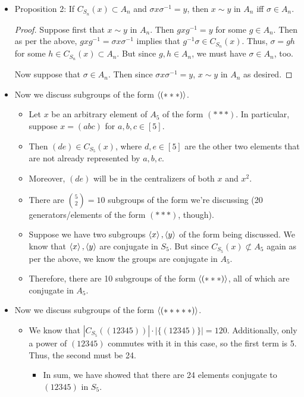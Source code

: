 \documentclass[../notes.tex]{subfiles}
\begin{document}
\begin{itemize}
    \item Proposition 2: If $C_{S_n}(x)\subset A_n$ and $\sigma x\sigma^{-1}=y$, then $x\sim y$ in $A_n$ iff $\sigma\in A_n$.
    \begin{proof}
        Suppose first that $x\sim y$ in $A_n$. Then $gxg^{-1}=y$ for some $g\in A_n$. Then as per the above, $gxg^{-1}=\sigma x\sigma^{-1}$ implies that $g^{-1}\sigma\in C_{S_n}(x)$. Thus, $\sigma=gh$ for some $h\in C_{S_n}(x)\subset A_n$. But since $g,h\in A_n$, we must have $\sigma\in A_n$, too.\par
        Now suppose that $\sigma\in A_n$. Then since $\sigma x\sigma^{-1}=y$, $x\sim y$ in $A_n$ as desired.
    \end{proof}
    \item Now we discuss subgroups of the form $\left\langle{(***)}\right\rangle$.
    \begin{itemize}
        \item Let $x$ be an arbitrary element of $A_5$ of the form $(***)$. In particular, suppose $x=(abc)$ for $a,b,c\in[5]$.
        \item Then $(de)\in C_{S_5}(x)$, where $d,e\in[5]$ are the other two elements that are not already represented by $a,b,c$.
        \item Moreover, $(de)$ will be in the centralizers of both $x$ and $x^2$.
        \item There are $\binom{5}{2}=10$ subgroups of the form we're discussing (20 generators/elements of the form $(***)$, though).
        \item Suppose we have two subgroups $\left\langle{x}\right\rangle,\left\langle{y}\right\rangle$ of the form being discussed. We know that $\left\langle{x}\right\rangle,\left\langle{y}\right\rangle$ are conjugate in $S_5$. But since $C_{S_5}(x)\not\subset A_5$ again as per the above, we know the groups are conjugate in $A_5$.
        \item Therefore, there are 10 subgroups of the form $\left\langle{(***)}\right\rangle$, all of which are conjugate in $A_5$.
    \end{itemize}
    \item Now we discuss subgroups of the form $\left\langle{(*****)}\right\rangle$.
    \begin{itemize}
        \item We know that $|C_{S_5}((12345))|\cdot|\{(12345)\}|=120$. Additionally, only a power of $(12345)$ commutes with it in this case, so the first term is 5. Thus, the second must be 24.
        \begin{itemize}
            \item In sum, we have showed that there are 24 elements conjugate to $(12345)$ in $S_5$.

\end{itemize}
\end{itemize}
\end{itemize}
\end{document}

